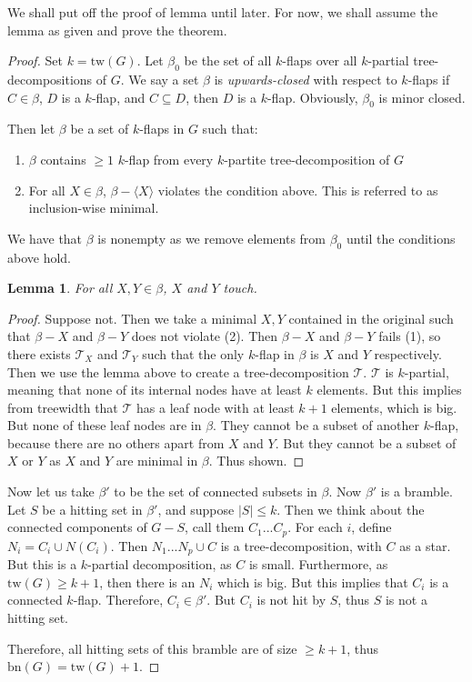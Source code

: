 \documentclass[]{article}
\newcommand{\tree}{\mathcal{T}}
\newcommand{\tw}{\text{tw}}
\newcommand{\bn}{\text{bn}}
\newtheorem{lemma}[theorem]{Lemma}
\theoremstyle{definition}
\numberwithin{theorem}{section}
\numberwithin{equation}{section}
\begin{document}
We shall put off the proof of lemma until later. For now, we shall assume the lemma as given and prove the theorem. 

\begin{proof}
	Set $k = \tw(G)$.
	Let $\beta_0$ be the set of all $k$-flaps over all $k$-partial tree-decompositions of $G$. We say a set $\beta$ is \textit{upwards-closed} with respect to $k$-flaps if $C \in \beta$, $D$ is a $k$-flap, and $C \subseteq D$, then $D$ is a $k$-flap. Obviously, $\beta_0$ is minor closed. 
	
	Then let $\beta$ be a set of $k$-flaps in $G$ such that:
	\begin{enumerate}
		\item $\beta$ contains $\geq 1$ $k$-flap from every $k$-partite tree-decomposition of $G$
		\item For all $X \in \beta$, $\beta - \langle X \rangle$ violates the condition above. This is referred to as inclusion-wise minimal.
	\end{enumerate}
	We have that $\beta$ is nonempty as we remove elements from $\beta_0$ until the conditions above hold. 
	
	\begin{lemma}
		For all $X, Y \in \beta$, $X$ and $Y$ touch.
	\end{lemma}
	\begin{proof}
	Suppose not. Then we take a minimal $X, Y$ contained in the original such that $\beta - X$ and $\beta - Y$ does not violate (2). Then $\beta - X$ and $\beta - Y$ fails (1), so there exists $\tree_X$ and $\tree_Y$ such that the only $k$-flap in $\beta$ is $X$ and $Y$ respectively. Then we use the lemma above to create a tree-decomposition $\tree$. $\tree$ is $k$-partial, meaning that none of its internal nodes have at least $k$ elements. But this implies from treewidth that $\tree$ has a leaf node with at least $k + 1$ elements, which is big. But none of these leaf nodes are in $\beta$. They cannot be a subset of another $k$-flap, because there are no others apart from $X$ and $Y$. But they cannot be a subset of $X$ or $Y$ as $X$ and $Y$ are minimal in $\beta$. Thus shown.
	\end{proof}
	Now let us take $\beta'$ to be the set of connected subsets in $\beta$. Now $\beta'$ is a bramble. Let $S$ be a hitting set in $\beta'$, and suppose $|S| \leq k$. Then we think about the connected components of $G - S$, call them $C_1 ... C_p$. For each $i$, define $N_i = C_i \cup N(C_i)$. Then $N_1 ... N_p \cup C$ is a tree-decomposition, with $C$ as a star. But this is a $k$-partial decomposition, as $C$ is small. Furthermore, as $\tw(G) \geq k + 1$, then there is an $N_i$ which is big. But this implies that $C_i$ is a connected $k$-flap. Therefore, $C_i \in \beta'$. But $C_i$ is not hit by $S$, thus $S$ is not a hitting set.
	
	Therefore, all hitting sets of this bramble are of size $\geq k + 1$, thus $\bn(G) = \tw(G) + 1$. 
\end{proof}
\end{document}
